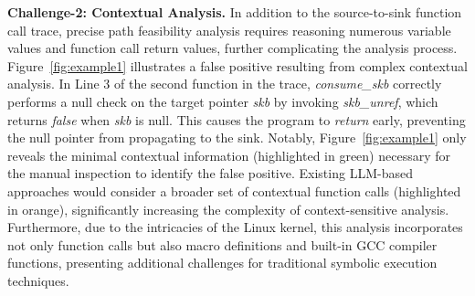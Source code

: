 \textbf{Challenge-2: Contextual Analysis.} 
In addition to the source-to-sink function call trace, precise path feasibility analysis requires reasoning numerous variable values and function call return values, further complicating the analysis process. Figure~\ref{fig:example1} illustrates a false positive resulting from complex contextual analysis. In Line 3 of the second function in the trace, \textit{consume\_skb} correctly performs a null check on the target pointer \textit{skb} by invoking \textit{skb\_unref}, which returns \textit{false} when \textit{skb} is null. This causes the program to \textit{return} early, preventing the null pointer from propagating to the sink. Notably, Figure~\ref{fig:example1} only reveals the minimal contextual information (highlighted in green) necessary for the manual inspection to identify the false positive. Existing LLM-based approaches would consider a broader set of contextual function calls (highlighted in orange), significantly increasing the complexity of context-sensitive analysis. Furthermore, due to the intricacies of the Linux kernel, this analysis incorporates not only function calls but also macro definitions and built-in GCC compiler functions, presenting additional challenges for traditional symbolic execution techniques.

